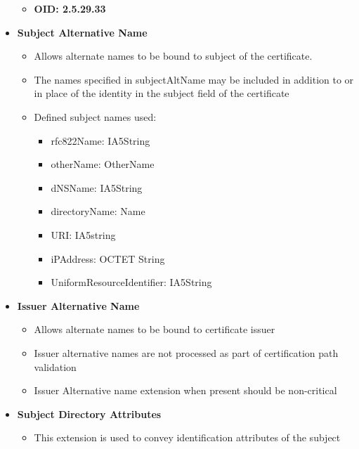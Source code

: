 \documentclass[a4paper]{article}
\begin{document}
\begin{itemize}
\begin{itemize}
                    \item \textbf{OID: 2.5.29.33}
                \end{itemize}
            \item \textbf{Subject Alternative Name}
                \begin{itemize}
                    \item Allows alternate names to be bound to subject of the certificate. 
                    \item The names specified in subjectAltName may be included in addition to
                        or in place of the identity in the subject field of the certificate
                    \item Defined subject names used:
                        \begin{itemize}
                            \item rfc822Name:       IA5String
                            \item otherName:        OtherName
                            \item dNSName:          IA5String
                            \item directoryName:    Name
                            \item URI:              IA5string
                            \item iPAddress:        OCTET String
                            \item UniformResourceIdentifier: IA5String
                        \end{itemize}
                \end{itemize}
            \item \textbf{Issuer Alternative Name}
                \begin{itemize}
                    \item Allows alternate names to be bound to certificate issuer
                    \item Issuer alternative names are not processed as part of certification path validation
                    \item Issuer Alternative name extension when present should be non-critical
                \end{itemize}
            \item \textbf{Subject Directory Attributes}
                \begin{itemize}
                    \item This extension is used to convey identification attributes of the subject

\end{itemize}
\end{itemize}
\end{document}
